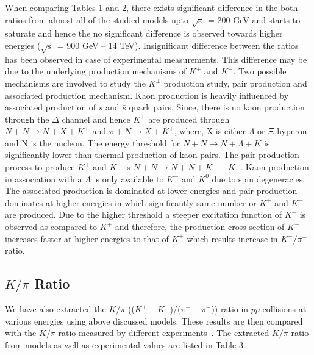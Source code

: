 \documentclass{article}
\newcommand{\sqrts}{\mbox{$\sqrt{\mathrm{s}}$}}
\newcommand{\lam}{$\Lambda$}
\begin{document}

When comparing Tables 1 and 2, there exists significant difference in the both ratios from almost all of the studied models upto \sqrts~= 200 GeV and starts to saturate and hence the no significant difference is observed towards higher energies (\sqrts~= 900 GeV -- 14 TeV). Insignificant difference between the ratios has been observed in case of experimental measurements. This difference may be due to the underlying production mechanisms of $K^+$ and $K^-$. Two possible mechanisms are involved to study the $K^\pm$ production study, pair production and associated production mechanism. Kaon production is heavily influenced by associated production of $s$ and $\bar s$ quark pairs. Since, there is no kaon production through the $\Delta$ channel and hence $K^+$ are produced through $N + N \rightarrow N + X + K^+$ and $\pi + N \rightarrow X + K^+$, where, X is either {\lam} or $\Xi$ hyperon and N is the nucleon. The energy threshold for $N + N \rightarrow N + \Lambda + K$ is significantly lower than thermal production of kaon pairs. The pair production process to produce $K^+$ and $K^-$ is $N + N \rightarrow N + N + K^+ + K^-$. Kaon production in association with a $\Lambda$ is only available to $K^+$ and $K^0$ due to spin degeneracies. The associated production is dominated at lower energies and pair production dominates at higher energies in which significantly same number or $K^+$ and $K^-$ are produced. Due to the higher threshold a steeper excitation function of $K^-$ is observed as compared to $K^+$ and therefore, the production cross-section of $K^-$ increases faster at higher energies to that of $K^+$ which results increase in $K^-/\pi^-$ ratio.           






\subsection{$K/\pi$ Ratio}

We have also extracted the $K/\pi$ (($K^+ + K^-$)/($\pi^+ + \pi^-$)) ratio in $pp$ collisions at various energies using above discussed models. These results are then compared with the $K/\pi$ ratio measured by different experiments~\cite{Pulawski:2015tka, NA49:2009brx, PHENIX:2011rvu, STAR:2008med, ALICE:2011gmo, ALICE:2015ial}. The extracted $K/\pi$ ratio from models as well as experimental values are listed in Table 3.     
\end{document}
